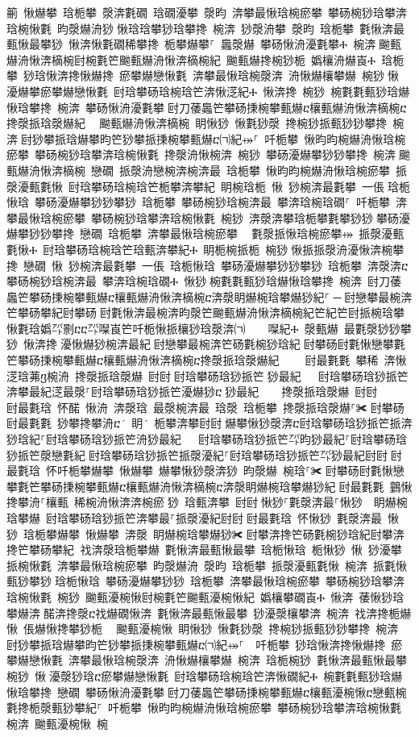 ﻿\documentclass[output=paper]{langsci/langscibook}
\begin{document}
\begin{exe}
{\begin{exe}
䈀 愀爀攀 琀栀攀 漀渀氀礀 琀礀瀀攀 漀昀 渀攀最愀琀椀瘀攀 攀砀椀猀琀攀渀琀椀愀氀 昀漀爀洀猀਀愀琀琀攀猀琀攀搀 椀渀 猀漀洀攀 漀昀 琀栀攀 氀愀渀最甀愀最攀猀 愀渀愀氀礀稀攀搀 栀攀爀攀⸀ 䘀漀爀 攀砀愀洀瀀氀攀Ⰰ 椀渀਀䬀甀爀洀愀渀樀椀尀椀氀笀䬀甀爀洀愀渀樀椀紀 䬀甀爀搀椀猀栀 嬀欀洀爀崀Ⰰ 琀栀攀 猀琀愀渀搀愀爀搀 瘀攀爀戀愀氀 渀攀最愀琀椀漀渀 洀愀爀欀攀爀 椀猀਀愀 瀀爀攀瘀攀爀戀愀氀 尀琀攀砀琀椀琀笀渀愀㴀紀Ⰰ 愀渀搀 椀猀 椀氀氀甀猀琀爀愀琀攀搀 椀渀 攀砀愀洀瀀氀攀਀尀刀䔀䘀笀攀砀㨀椀攀甀爀ⴀ欀甀爀洀愀渀樀椀ⴀ搀漀挀琀漀爀紀 ⠀䬀甀爀洀愀渀樀椀 眀愀猀 愀氀猀漀 搀椀猀挀甀猀猀攀搀 椀渀਀尀猀攀挀琀爀攀昀笀猀攀挀㨀椀攀甀爀ⴀ㈀紀⤀⸀ 吀栀攀 愀昀昀椀爀洀愀琀椀瘀攀 攀砀椀猀琀攀渀琀椀愀氀 搀漀洀愀椀渀 椀猀 攀砀瀀爀攀猀猀攀搀 椀渀਀䬀甀爀洀愀渀樀椀 戀礀 挀漀洀戀椀渀椀渀最 琀栀攀 愀昀昀椀爀洀愀琀椀瘀攀 挀漀瀀甀氀愀 尀琀攀砀琀椀琀笀栀攀渀攀紀 眀椀琀栀 愀 猀椀渀最氀攀 一倀਀琀栀愀琀 攀砀瀀爀攀猀猀攀猀 琀栀攀 攀砀椀猀琀椀渀最 攀渀琀椀琀礀⸀ 吀栀攀 渀攀最愀琀椀瘀攀 攀砀椀猀琀攀渀琀椀愀氀 椀猀 渀漀渀攀琀栀攀氀攀猀猀਀攀砀瀀爀攀猀猀攀搀 戀礀 琀栀攀 渀攀最愀琀椀瘀攀 ⠀氀漀挀愀琀椀瘀攀⤀ 挀漀瀀甀氀愀Ⰰ 尀琀攀砀琀椀琀笀琀甀渀攀紀Ⰰ 眀栀椀挀栀 椀猀਀愀挀挀漀洀瀀愀渀椀攀搀 戀礀 愀 猀椀渀最氀攀 一倀 琀栀愀琀 攀砀瀀爀攀猀猀攀猀 琀栀攀 渀漀渀ⴀ攀砀椀猀琀椀渀最 攀渀琀椀琀礀Ⰰ 愀猀਀椀氀氀甀猀琀爀愀琀攀搀 椀渀 尀刀䔀䘀笀攀砀㨀椀攀甀爀ⴀ欀甀爀洀愀渀樀椀ⴀ渀漀眀爀椀琀攀爀猀紀⸀਀─਀尀戀攀最椀渀笀攀砀攀紀尀攀砀਀尀氀愀渀最椀渀昀漀笀䬀甀爀洀愀渀樀椀紀笀紀笀尀挀椀琀攀愀氀琀嬀㌀㔀ⴀⴀ㌀㘀崀笀吀栀愀挀欀猀琀漀渀㈀　　㘀紀Ⰰ 漀甀爀 最氀漀猀猀攀猀 愀渀搀਀瀀愀爀猀椀渀最紀਀尀戀攀最椀渀笀砀氀椀猀琀紀਀尀攀砀尀氀愀戀攀氀笀攀砀㨀椀攀甀爀ⴀ欀甀爀洀愀渀樀椀ⴀ搀漀挀琀漀爀紀਀    尀最氀氀 攀稀 渀愀㴀琀茀ⴂ椀洀 搀漀挀琀漀爀 尀尀਀尀琀攀砀琀猀挀笀㄀猀最紀   尀琀攀砀琀猀挀笀渀攀最紀㴀最漀⸀尀琀攀砀琀猀挀笀瀀爀猀ⴀ㄀猀最紀    搀漀挀琀漀爀 尀尀਀    尀最氀琀 怀䤀 愀洀 渀漀琀 最漀椀渀最 琀漀 琀栀攀 搀漀挀琀漀爀⸀✀਀尀攀砀਀尀最氀氀 猀攀搀攀洀ⴀ 眀 栀攀渀攀尀尀਀爀攀愀猀漀渀ⴀ尀琀攀砀琀猀挀笀挀渀猀琀紀⸀尀琀攀砀琀猀挀笀洀猀最紀   尀琀攀砀琀猀挀笀㌀昀猀最紀⸀尀琀攀砀琀猀挀笀漀戀氀紀਀尀琀攀砀琀猀挀笀挀漀瀀紀⸀尀琀攀砀琀猀挀笀㌀猀最紀尀尀਀尀最氀琀 怀吀栀攀爀攀 愀爀攀 爀攀愀猀漀渀猀 昀漀爀 椀琀⸀✀਀尀攀砀尀氀愀戀攀氀笀攀砀㨀椀攀甀爀ⴀ欀甀爀洀愀渀樀椀ⴀ渀漀眀爀椀琀攀爀猀紀਀尀最氀氀 䴀愀搀攀洀⸀欀甀 稀椀洀愀渀渀椀瘀猀 琀甀渀攀 尀尀਀愀猀⸀氀漀渀最⸀愀猀  眀爀椀琀攀爀 尀琀攀砀琀猀挀笀渀攀最⸀挀漀瀀紀尀尀਀尀最氀琀 怀愀猀 氀漀渀最 愀猀 琀栀攀爀攀 愀爀攀 渀漀 眀爀椀琀攀爀猀✀਀尀攀渀搀笀砀氀椀猀琀紀尀攀渀搀笀攀砀攀紀਀਀䄀渀漀琀栀攀爀 氀愀渀最甀愀最攀 琀栀愀琀 栀愀猀 愀 猀瀀攀挀椀愀氀 渀攀最愀琀椀瘀攀 昀漀爀洀 漀昀 琀栀攀 挀漀瀀甀氀愀 椀渀 挀氀愀甀猀攀猀਀琀栀愀琀 攀砀瀀爀攀猀猀 琀栀攀 渀攀最愀琀椀瘀攀 攀砀椀猀琀攀渀琀椀愀氀 椀猀 䬀甀瀀椀愀尀椀氀笀䬀甀瀀椀愀紀 嬀欀攀礀崀Ⰰ 愀渀 䔀愀猀琀攀爀渀਀䤀渀搀漀ⴀ䄀爀礀愀渀 氀愀渀最甀愀最攀 猀瀀漀欀攀渀 椀渀 䄀渀搀栀爀愀 倀爀愀搀攀猀栀 ⠀䬀甀瀀椀愀 眀愀猀 愀氀猀漀 搀椀猀挀甀猀猀攀搀 椀渀਀尀猀攀挀琀爀攀昀笀猀攀挀㨀椀攀甀爀ⴀ㈀紀⤀⸀  吀栀攀 猀琀愀渀搀愀爀搀 瘀攀爀戀愀氀 渀攀最愀琀椀漀渀 洀愀爀欀攀爀 椀渀 琀栀椀猀 氀愀渀最甀愀最攀 椀猀 愀਀瀀漀猀琀ⴀ瘀攀爀戀愀氀 尀琀攀砀琀椀琀笀渀愀礀紀Ⰰ 椀氀氀甀猀琀爀愀琀攀搀 戀礀 攀砀愀洀瀀氀攀਀尀刀䔀䘀笀攀砀㨀椀攀甀爀ⴀ欀甀瀀椀愀ⴀ戀甀椀氀搀栀漀甀猀攀紀⸀ 吀栀攀 愀昀昀椀爀洀愀琀椀瘀攀 攀砀椀猀琀攀渀琀椀愀氀 椀渀 䬀甀瀀椀愀 椀
\end{exe}}
\end{exe}
\end{document}
